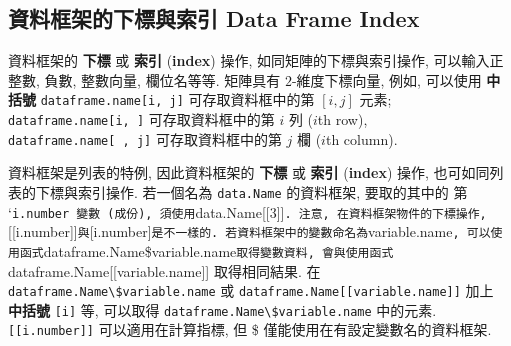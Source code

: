 \documentclass[
]{book}
\begin{document}
\hypertarget{ux8cc7ux6599ux6846ux67b6ux7684ux4e0bux6a19ux8207ux7d22ux5f15-data-frame-index}{%
\subsection{資料框架的下標與索引 Data Frame Index}\label{ux8cc7ux6599ux6846ux67b6ux7684ux4e0bux6a19ux8207ux7d22ux5f15-data-frame-index}}

資料框架的
\textbf{下標}
或
\textbf{索引}
(\textbf{index})
操作,
如同矩陣的下標與索引操作,
可以輸入正整數, 負數, 整數向量, 欄位名等等.
矩陣具有 \(2\)-維度下標向量,
例如, 可以使用
\textbf{中括號}
\texttt{dataframe.name{[}i,\ j{]}}
可存取資料框中的第 \([i, j]\) 元素;
\texttt{dataframe.name{[}i,\ {]}}
可存取資料框中的第 \(i\) 列 (\(i\)th row),
\texttt{dataframe.name{[}\ ,\ j{]}}
可存取資料框中的第 \(j\) 欄 (\(i\)th column).

資料框架是列表的特例,
因此資料框架的
\textbf{下標}
或
\textbf{索引}
(\textbf{index})
操作,
也可如同列表的下標與索引操作.
若一個名為 \texttt{data.Name} 的資料框架,
要取的其中的 第 `\texttt{i.number\textquotesingle{}\textquotesingle{}\ 變數\ (成份),\ 須使用}data.Name{[}{[}3{]}{]}\texttt{.\ 注意,\ 在資料框架物件的下標操作,}{[}{[}i.number{]}{]}\texttt{與}{[}i.number{]}\texttt{是不一樣的.\ 若資料框架中的變數命名為}variable.name\texttt{,\ 可以使用函式}dataframe.Name\$variable.name\texttt{取得變數資料,\ 會與使用函式}dataframe.Name{[}{[}variable.name{]}{]} 取得相同結果.
在
\texttt{dataframe.Name\textbackslash{}\$variable.name}
或
\texttt{dataframe.Name{[}{[}variable.name{]}{]}}
加上 \textbf{中括號}
\texttt{{[}i{]}} 等,
可以取得
\texttt{dataframe.Name\textbackslash{}\$variable.name} 中的元素.
\texttt{{[}{[}i.number{]}{]}} 可以適用在計算指標,
但 \$ 僅能使用在有設定變數名的資料框架.
\end{document}
